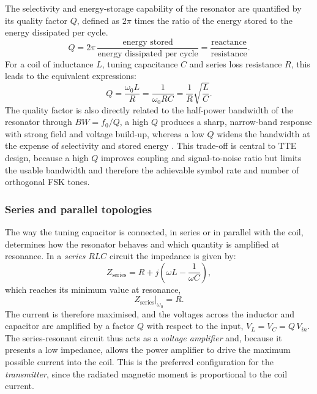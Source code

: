The selectivity and energy-storage capability of the resonator are quantified by
its quality factor $Q$, defined as $2\pi$ times the ratio of the energy stored to
the energy dissipated per cycle.
\begin{equation}
    Q = 2\pi\,\frac{\text{energy stored}}{\text{energy dissipated per cycle}}
      = \frac{\text{reactance}}{\text{resistance}}.
    \label{eq:q_definition}
\end{equation}
For a coil of inductance $L$, tuning capacitance $C$ and series loss resistance
$R$, this leads to the equivalent expressions:
\begin{equation}
    Q = \frac{\omega_0 L}{R} = \frac{1}{\omega_0 R C}
      = \frac{1}{R}\sqrt{\frac{L}{C}}.
    \label{eq:q_forms}
\end{equation}
The quality factor is also directly related to the half-power bandwidth of the
resonator through $BW = f_0/Q$, a high $Q$
produces a sharp, narrow-band response with strong field and voltage build-up,
whereas a low $Q$ widens the bandwidth at the expense of selectivity and stored
energy \cite{sadiku, jiang2015capacity}. This trade-off is central to TTE design, because
a high $Q$ improves coupling and signal-to-noise ratio but limits the usable
bandwidth and therefore the achievable symbol rate and number of orthogonal
FSK tones.

\subsubsection*{Series and parallel topologies}

The way the tuning capacitor is connected, in series or in parallel with the coil,
determines how the resonator behaves and which quantity is amplified at
resonance. In a \emph{series} $RLC$ circuit the impedance is given by:
\begin{equation}
    Z_{\text{series}} = R + j\!\left(\omega L - \frac{1}{\omega C}\right),
    \label{eq:z_series}
\end{equation}
which reaches its minimum value at resonance,
\begin{equation}
    Z_{\text{series}}\big|_{\omega_0} = R.
    \label{eq:z_series_res}
\end{equation}
The current is therefore maximised, and the voltages across the inductor and
capacitor are amplified by a factor $Q$ with respect to the input,
$V_L = V_C = Q\,V_{in}$. The series-resonant circuit thus acts as a
\emph{voltage amplifier} and, because it presents a low impedance, allows the
power amplifier to drive the maximum possible current into the coil. This is the
preferred configuration for the \emph{transmitter}, since the radiated magnetic
moment is proportional to the coil current.

